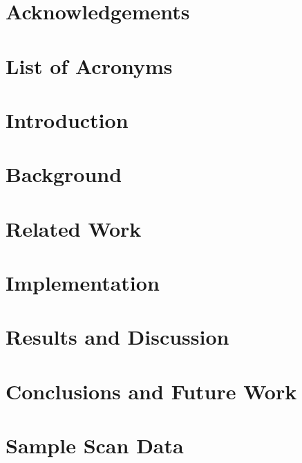 \documentclass[11pt, a4paper, oneside]{report}
\begin{document}
\chapter*{Acknowledgements}

\chapter*{List of Acronyms}

\listoffigures
\listoftables
\lstlistoflistings
\tableofcontents
{}
\chapter{Introduction}

\chapter{Background}

\chapter{Related Work}

\chapter{Implementation}

\chapter{Results and Discussion} 

\chapter{Conclusions and Future Work}



\appendix
\chapter{Sample Scan Data}

\end{document}
